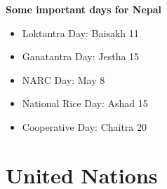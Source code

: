 \documentclass[
  openany]{book}
\providecommand{\tightlist}{%
  \setlength{\itemsep}{0pt}\setlength{\parskip}{0pt}}
\begin{document}
\textbf{Some important days for Nepal}

\begin{itemize}
\tightlist
\item
  Loktantra Day: Baisakh 11
\item
  Ganatantra Day: Jestha 15
\item
  NARC Day: May 8
\item
  National Rice Day: Ashad 15
\item
  Cooperative Day: Chaitra 20
\end{itemize}

\hypertarget{united-nations}{%
\section{United Nations}\label{united-nations}}
\end{document}
